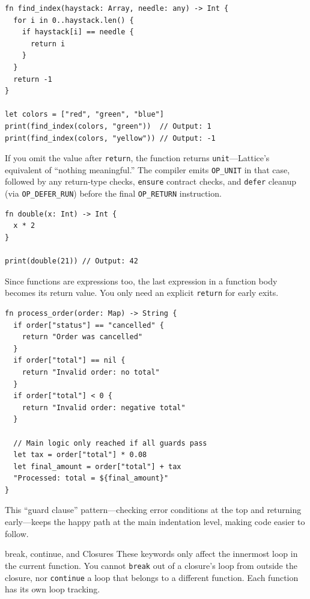 \begin{lstlisting}[language=Lattice, caption={Early return from a function}]
fn find_index(haystack: Array, needle: any) -> Int {
  for i in 0..haystack.len() {
    if haystack[i] == needle {
      return i
    }
  }
  return -1
}

let colors = ["red", "green", "blue"]
print(find_index(colors, "green"))  // Output: 1
print(find_index(colors, "yellow")) // Output: -1
\end{lstlisting}

If you omit the value after \lstinline|return|, the function returns \lstinline|unit|---Lattice's equivalent of ``nothing meaningful.'' The compiler emits \lstinline|OP_UNIT| in that case, followed by any return-type checks, \lstinline|ensure| contract checks, and \lstinline|defer| cleanup (via \lstinline|OP_DEFER_RUN|) before the final \lstinline|OP_RETURN| instruction.

\begin{lstlisting}[language=Lattice, caption={Implicit return: no return keyword needed}]
fn double(x: Int) -> Int {
  x * 2
}

print(double(21)) // Output: 42
\end{lstlisting}

Since functions are expressions too, the last expression in a function body becomes its return value. You only need an explicit \lstinline|return| for early exits.

\begin{lstlisting}[language=Lattice, caption={Guard clauses with early return}]
fn process_order(order: Map) -> String {
  if order["status"] == "cancelled" {
    return "Order was cancelled"
  }
  if order["total"] == nil {
    return "Invalid order: no total"
  }
  if order["total"] < 0 {
    return "Invalid order: negative total"
  }

  // Main logic only reached if all guards pass
  let tax = order["total"] * 0.08
  let final_amount = order["total"] + tax
  "Processed: total = ${final_amount}"
}
\end{lstlisting}

This ``guard clause'' pattern---checking error conditions at the top and returning early---keeps the happy path at the main indentation level, making code easier to follow.

\begin{notebox}{break, continue, and Closures}
These keywords only affect the innermost loop in the current function. You cannot \lstinline|break| out of a closure's loop from outside the closure, nor \lstinline|continue| a loop that belongs to a different function. Each function has its own loop tracking.
\end{notebox}

